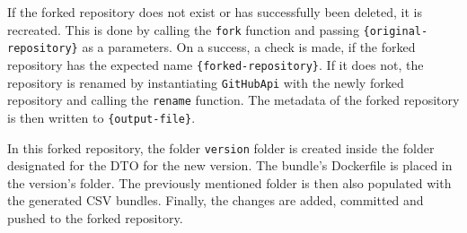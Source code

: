 If the forked repository does not exist or has successfully been deleted, it is recreated.
This is done by calling the \verb|fork| function and passing \verb|{original-repository}| as a parameters.
On a success, a check is made, if the forked repository has the expected name \verb|{forked-repository}|.
If it does not, the repository is renamed by instantiating \verb|GitHubApi| with the newly forked repository and calling the \verb|rename| function.
The metadata of the forked repository is then written to \verb|{output-file}|.

In this forked repository, the folder \verb|version| folder is created inside the folder designated for the DTO for the new version.
The bundle's Dockerfile is placed in the version's folder.
The previously mentioned folder is then also populated with the generated CSV bundles.
Finally, the changes are added, committed and pushed to the forked repository.
